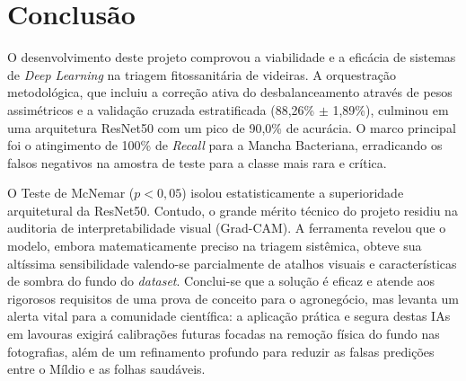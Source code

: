 \documentclass[12pt, a4paper]{article}
\begin{document}
\section{Conclusão}
O desenvolvimento deste projeto comprovou a viabilidade e a eficácia de sistemas de \textit{Deep Learning} na triagem fitossanitária de videiras. A orquestração metodológica, que incluiu a correção ativa do desbalanceamento através de pesos assimétricos e a validação cruzada estratificada (88,26\% $\pm$ 1,89\%), culminou em uma arquitetura ResNet50 com um pico de 90,0\% de acurácia. O marco principal foi o atingimento de 100\% de \textit{Recall} para a Mancha Bacteriana, erradicando os falsos negativos na amostra de teste para a classe mais rara e crítica.

O Teste de McNemar ($p < 0,05$) isolou estatisticamente a superioridade arquitetural da ResNet50. Contudo, o grande mérito técnico do projeto residiu na auditoria de interpretabilidade visual (Grad-CAM). A ferramenta revelou que o modelo, embora matematicamente preciso na triagem sistêmica, obteve sua altíssima sensibilidade valendo-se parcialmente de atalhos visuais e características de sombra do fundo do \textit{dataset}. Conclui-se que a solução é eficaz e atende aos rigorosos requisitos de uma prova de conceito para o agronegócio, mas levanta um alerta vital para a comunidade científica: a aplicação prática e segura destas IAs em lavouras exigirá calibrações futuras focadas na remoção física do fundo nas fotografias, além de um refinamento profundo para reduzir as falsas predições entre o Míldio e as folhas saudáveis.

\renewcommand{\refname}{Referências}


\end{document}

